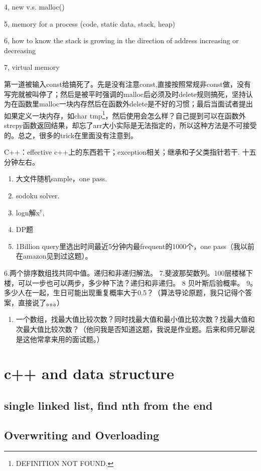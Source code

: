 \documentclass[12pt]{book}
\begin{document}
4, new v.s. malloc()

5, memory for a process (code, static data, stack, heap)

6, how to know the stack is growing in the direction of address increasing 
or decreasing

7, virtual memory

第一道被输入const给搞死了。先是没有注意const,直接按照常规非const做，没有写完就被叫停了；然后是被平时强调的malloc后必须及时delete规则搞死，坚持认为在函数里malloc一块内存然后在函数外delete是不好的习惯；最后当面试者提出如果定义一块内存，如char tmp\footnote{DEFINITION NOT FOUND.}，然后使用会怎么样？自己提到可以在函数外strcpy函数返回结果，却忘了arr大小实际是无法指定的，所以这种方法是不可接受的。总之，很多的trick在里面没有注意到。

C++：effective c++上的东西若干；exception相关；继承和子父类指针若干. 十五分钟左右。
\begin{enumerate}
\item 大文件随机sample，one pass.
\item sodoku solver.
\item logn解x$^{\text{y}}$,
\item DP题
\item 1Billion query里选出时间最近5分钟内最frequent的1000个，one pass（我以前在amazon见到过这题）。
\end{enumerate}
6.两个排序数组找共同中值。递归和非递归解法。
7.斐波那契数列。100层楼梯下楼，可以一步也可以两步，多少种下法？递归和非递归。 
8 贝叶斯后验概率。
9。多少人在一起，生日可能出现重复概率大于0.5？（算法导论原题，我只记得个答案，直接说了。。。）
\begin{enumerate}
\item 一个数组，找最大值比较次数？同时找最大值和最小值比较次数？找最大值和次最大值比较次数？（他问我是否知道这题，我说是作业题。后来和师兄聊说是这他常拿来用的面试题。）
\end{enumerate}

\chapter{c++ and data structure}
\label{sec-12}
\section{single linked list, find nth from the end}
\label{sec-12-1}
\section{Overwriting and Overloading}
\label{sec-12-2}
\end{document}
